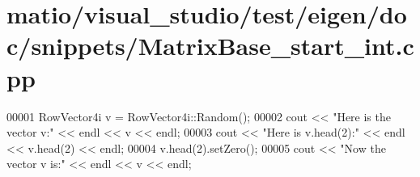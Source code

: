 \hypertarget{matio_2visual__studio_2test_2eigen_2doc_2snippets_2_matrix_base__start__int_8cpp_source}{}\section{matio/visual\+\_\+studio/test/eigen/doc/snippets/\+Matrix\+Base\+\_\+start\+\_\+int.cpp}
\label{matio_2visual__studio_2test_2eigen_2doc_2snippets_2_matrix_base__start__int_8cpp_source}

\begin{DoxyCode}
00001 RowVector4i v = RowVector4i::Random();
00002 cout << \textcolor{stringliteral}{"Here is the vector v:"} << endl << v << endl;
00003 cout << \textcolor{stringliteral}{"Here is v.head(2):"} << endl << v.head(2) << endl;
00004 v.head(2).setZero();
00005 cout << \textcolor{stringliteral}{"Now the vector v is:"} << endl << v << endl;
\end{DoxyCode}
